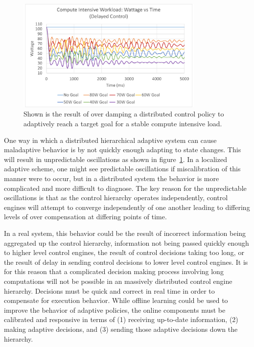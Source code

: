             \begin{figure}[htb!]
                \centering
                \includegraphics[width=0.82\textwidth]{Fig/compute_delay_graph.pdf}
                \caption[Compute Intensive Workload Using an Adaptive Goal Adjustment Policy with Differing Delayed Control (Watts vs Time)]{Shown is the result of over damping a distributed control policy to adaptively reach a target goal for a stable compute intensive load.}
                \label{fig:compute_delay_graph}
            \end{figure}

            One way in which a distributed hierarchical adaptive system can cause maladaptive behavior is by not quickly enough adapting to state changes. This will result in unpredictable oscillations as shown in figure~\ref{fig:compute_delay_graph}. In a localized adaptive scheme, one might see predictable oscillations if miscalibration of this manner were to occur, but in a distributed system the behavior is more complicated and more difficult to diagnose. The key reason for the unpredictable oscillations is that as the control hierarchy operates independently, control engines will attempt to converge independently of one another leading to differing levels of over compensation at differing points of time.

            In a real system, this behavior could be the result of incorrect information being aggregated up the control hierarchy, information not being passed quickly enough to higher level control engines, the result of control decisions taking too long, or the result of delay in sending control decisions to lower level control engines. It is for this reason that a complicated decision making process involving long computations will not be possible in an massively distributed control engine hierarchy. Decisions must be quick and correct in real time in order to compensate for execution behavior. While offline learning could be used to improve the behavior of adaptive policies, the online components must be calibrated and responsive in terms of (1) receiving up-to-date information, (2) making adaptive decisions, and (3) sending those adaptive decisions down the hierarchy.


